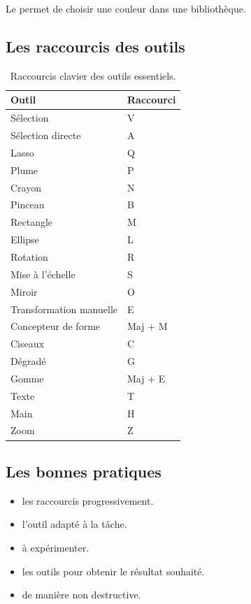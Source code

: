 Le  permet de choisir une couleur dans une bibliothèque.

\subsection{Les raccourcis des outils}

\begin{table}[h!]
\centering
\begin{tabular}{@{}ll@{}}
\toprule
\textbf{Outil} & \textbf{Raccourci} \\
\midrule
Sélection & V \\
Sélection directe & A \\
Lasso & Q \\
Plume & P \\
Crayon & N \\
Pinceau & B \\
Rectangle & M \\
Ellipse & L \\
Rotation & R \\
Mise à l'échelle & S \\
Miroir & O \\
Transformation manuelle & E \\
Concepteur de forme & Maj + M \\
Ciseaux & C \\
Dégradé & G \\
Gomme & Maj + E \\
Texte & T \\
Main & H \\
Zoom & Z \\
\bottomrule
\end{tabular}
\caption{Raccourcis clavier des outils essentiels.}
\end{table}

\subsection{Les bonnes pratiques}

\begin{itemize}
    \item {} les raccourcis progressivement.
    \item {} l'outil adapté à la tâche.
    \item {} à expérimenter.
    \item {} les outils pour obtenir le résultat souhaité.
    \item {} de manière non destructive.
\end{itemize}


